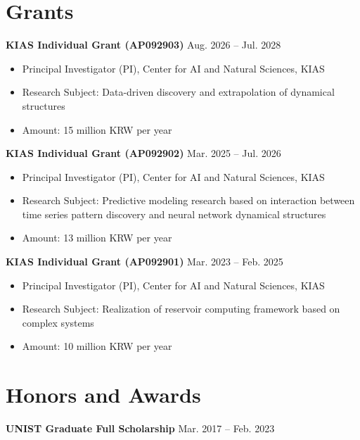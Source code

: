 \documentclass[11pt,a4paper]{article}
\newcommand{\cvitem}[2]{
    \noindent\textbf{#1} \hfill #2
}
\begin{document}
\section*{Grants}

\cvitem{KIAS Individual Grant (AP092903)}{Aug. 2026 -- Jul. 2028}
\begin{itemize}[leftmargin=1.5em, topsep=0.2em, itemsep=0.1em]
    \item Principal Investigator (PI), Center for AI and Natural Sciences, KIAS
    \item Research Subject: Data-driven discovery and extrapolation of dynamical structures
    \item Amount: 15 million KRW per year
\end{itemize}

\vspace{0.2em}

\cvitem{KIAS Individual Grant (AP092902)}{Mar. 2025 -- Jul. 2026}
\begin{itemize}[leftmargin=1.5em, topsep=0.2em, itemsep=0.1em]
    \item Principal Investigator (PI), Center for AI and Natural Sciences, KIAS
    \item Research Subject: Predictive modeling research based on interaction between time series pattern discovery and neural network dynamical structures
    \item Amount: 13 million KRW per year
\end{itemize}

\vspace{0.2em}

\cvitem{KIAS Individual Grant (AP092901)}{Mar. 2023 -- Feb. 2025}
\begin{itemize}[leftmargin=1.5em, topsep=0.2em, itemsep=0.1em]
    \item Principal Investigator (PI), Center for AI and Natural Sciences, KIAS
    \item Research Subject: Realization of reservoir computing framework based on complex systems
    \item Amount: 10 million KRW per year
\end{itemize}

\section*{Honors and Awards}

\cvitem{UNIST Graduate Full Scholarship}{Mar. 2017 -- Feb. 2023}
\end{document}
